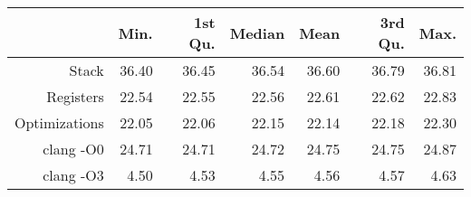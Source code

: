 \begin{table}[ht]
\centering
\begin{tabular}{rrrrrrr}
  \hline
 & Min. & 1st Qu. & Median & Mean & 3rd Qu. & Max. \\ 
  \hline
Stack & 36.40 & 36.45 & 36.54 & 36.60 & 36.79 & 36.81 \\ 
  Registers & 22.54 & 22.55 & 22.56 & 22.61 & 22.62 & 22.83 \\ 
  Optimizations & 22.05 & 22.06 & 22.15 & 22.14 & 22.18 & 22.30 \\ 
  clang -O0 & 24.71 & 24.71 & 24.72 & 24.75 & 24.75 & 24.87 \\ 
  clang -O3 & 4.50 & 4.53 & 4.55 & 4.56 & 4.57 & 4.63 \\ 
   \hline
\end{tabular}
\end{table}
